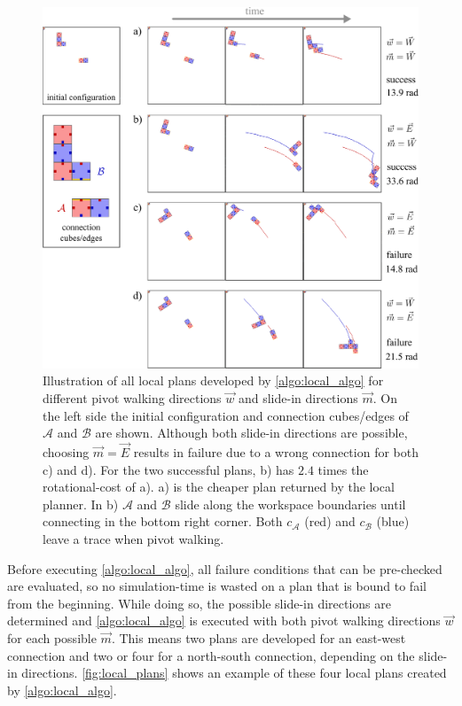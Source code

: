 \begin{figure}
	\centering
	\includegraphics[width=1\textwidth]{figures/local_plans.pdf}
	\caption[Local plans for all pivot walking and slide-in directions]{Illustration of all local plans developed by \autoref{algo:local_algo} for different pivot walking directions $\vec{w}$ and slide-in directions $\vec{m}$. On the left side the initial configuration and connection cubes/edges of $\mathcal{A}$ and $\mathcal{B}$ are shown. Although both slide-in directions are possible, choosing $\vec{m}=\vec{E}$ results in failure due to a wrong connection for both c) and d). For the two successful plans, b) has $2.4$ times the rotational-cost of a). a) is the cheaper plan returned by the local planner. In b) $\mathcal{A}$ and $\mathcal{B}$ slide along the workspace boundaries until connecting in the bottom right corner. Both $c_\mathcal{A}$ (red) and $c_\mathcal{B}$ (blue) leave a trace when pivot walking.}
	\label{fig:local_plans}
\end{figure}

Before executing \autoref{algo:local_algo}, all failure conditions that can be pre-checked are evaluated, so no simulation-time is wasted on a plan that is bound to fail from the beginning.
While doing so, the possible slide-in directions are determined and \autoref{algo:local_algo} is executed with both pivot walking directions $\vec{w}$ for each possible $\vec{m}$.
This means two plans are developed for an east-west connection and two or four for a north-south connection, depending on the slide-in directions.
\autoref{fig:local_plans} shows an example of these four local plans created by \autoref{algo:local_algo}.


